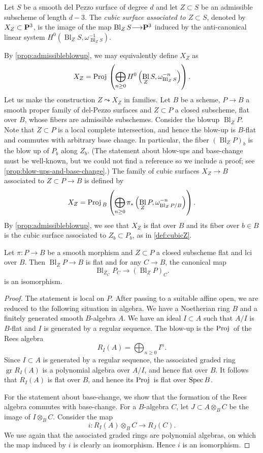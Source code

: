 \documentclass[11pt,reqno, letterpaper]{amsart}
\DeclareMathOperator{\Bl}{Bl}
\renewcommand{\to}{{\longrightarrow}}
\numberwithin{equation}{section}
\newcommand{\Proj}{{\text{\rm Proj}\,}}
\begin{document}
\begin{definition}
  \label{def:cubicZ}
  Let $S$ be a smooth del Pezzo surface of degree $d$ and let $Z \subset S$ be an admissible subscheme of length $d-3$.
  The \emph{cubic surface associated to $Z \subset S$}, denoted by
  $X_Z \subset \P^3$, is the image of the map
  $\Bl_{Z}S \to \P^3$ induced by the anti-canonical linear system $H^0\left(\Bl_ZS, \omega_{\Bl_Z S}^{-1}\right)$.
\end{definition}
By \autoref{prop:admissibleblowup}, we may equivalently define $X_Z$ as
\[ X_Z = \Proj \left( \bigoplus_{n \geq 0} H^0\left( \Bl_ZS, \omega_{\Bl_Z S}^{-n} \right) \right).\]
Let us make the construction $Z \leadsto X_Z$ in families.
Let $B$ be a scheme, $P \to B$ a smooth proper family of del-Pezzo surfaces and $Z \subset  P$ a closed subscheme, flat over $B$, whose fibers are admissible subschemes.
Consider the blowup $\Bl_{ Z}  P$.
Note that $Z \subset  P$ is a local complete intersection, and hence the blow-up is $B$-flat and commutes with arbitrary base change.
In particular, the fiber $(\Bl_ZP)_b$ is the blow up of $P_b$ along $Z_b$.
(The statement about blow-ups and base-change must be well-known, but we could not find a reference so we include a proof; see \autoref{prop:blow-ups-and-base-change}.)
The family of cubic surfaces $X_Z \to B$ associated to $Z \subset P \to B$ is defined by
\[
  X_Z = \Proj_B \left(\bigoplus_{n \geq 0}\pi_*\left(\Bl_ZP, \omega_{\Bl_ZP/B}^{-n}\right)\right).
\]
By \autoref{prop:admissibleblowup}, we see that $X_Z$ is flat over $B$
and its fiber over $b \in B$ is the cubic surface associated to
$Z_b \subset P_b$, as in \autoref{def:cubicZ}.
\begin{proposition}\label{prop:blow-ups-and-base-change}
  Let $\pi \colon P \to B$ be a smooth morphism and $Z \subset P$ a closed subscheme flat and lci over $B$.
  Then $\Bl_ZP \to B$ is flat and for any $C \to B$, the canonical map
  \[  \Bl_{Z_C} P_C \to \left(\Bl_ZP\right)_C.\]
  is an isomorphism.
\end{proposition}
\begin{proof}
  The statement is local on $P$.
  After passing to a suitable affine open, we are reduced to the following situation in algebra.
  We have a Noetherian ring $B$ and a finitely generated smooth $B$-algebra $A$.
  We have an ideal $I \subset A$ such that $A/I$ is $B$-flat and $I$ is generated by a regular sequence.
  The blow-up is the $\Proj$ of the Rees algebra
  \[R_I(A) = \bigoplus_{n \geq 0}I^n.\]
  Since $I \subset A$ is generated by a regular sequence, the associated graded ring $\operatorname{gr} R_I(A)$ is a polynomial algebra over $A/I$, and hence flat over $B$.
  It follows that $R_I(A)$ is flat over $B$, and hence its $\Proj$ is flat over $\spec B$.
  
  For the statement about base-change, we show that the formation of the Rees algebra commutes with base-change.
  For a $B$-algebra $C$, let $J \subset A \otimes_B C$ be the image of $I \otimes_B C$.
  Consider the map
  \[ i \colon R_I(A) \otimes_B C \to R_J(C).\]
  We use again that the associated graded rings are polynomial algebras, on which the map induced by $i$ is clearly an isomorphism.
  Hence $i$ is an isomorphism.
\end{proof}
\end{document}
